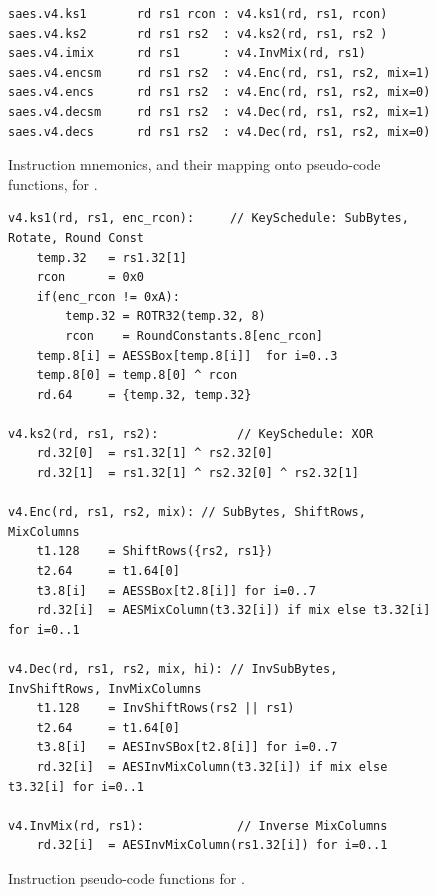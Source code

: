 
\vspace*{\fill}

\begin{figure}[!h]
\begin{lstlisting}[language=pseudo,style=block]
saes.v4.ks1       rd rs1 rcon : v4.ks1(rd, rs1, rcon)
saes.v4.ks2       rd rs1 rs2  : v4.ks2(rd, rs1, rs2 )
saes.v4.imix      rd rs1      : v4.InvMix(rd, rs1)
saes.v4.encsm     rd rs1 rs2  : v4.Enc(rd, rs1, rs2, mix=1)
saes.v4.encs      rd rs1 rs2  : v4.Enc(rd, rs1, rs2, mix=0)
saes.v4.decsm     rd rs1 rs2  : v4.Dec(rd, rs1, rs2, mix=1)
saes.v4.decs      rd rs1 rs2  : v4.Dec(rd, rs1, rs2, mix=0)
\end{lstlisting}
\caption{
  Instruction mnemonics, and their mapping onto pseudo-code functions, for .
}
\label{fig:v4:mnemonics}
\end{figure}

\begin{figure}[!h]
\begin{lstlisting}[language=pseudo,style=block]
v4.ks1(rd, rs1, enc_rcon):     // KeySchedule: SubBytes, Rotate, Round Const
    temp.32   = rs1.32[1]
    rcon      = 0x0
    if(enc_rcon != 0xA):
        temp.32 = ROTR32(temp.32, 8)
        rcon    = RoundConstants.8[enc_rcon]
    temp.8[i] = AESSBox[temp.8[i]]  for i=0..3
    temp.8[0] = temp.8[0] ^ rcon
    rd.64     = {temp.32, temp.32}

v4.ks2(rd, rs1, rs2):           // KeySchedule: XOR
    rd.32[0]  = rs1.32[1] ^ rs2.32[0]
    rd.32[1]  = rs1.32[1] ^ rs2.32[0] ^ rs2.32[1]

v4.Enc(rd, rs1, rs2, mix): // SubBytes, ShiftRows, MixColumns
    t1.128    = ShiftRows({rs2, rs1})
    t2.64     = t1.64[0]
    t3.8[i]   = AESSBox[t2.8[i]] for i=0..7
    rd.32[i]  = AESMixColumn(t3.32[i]) if mix else t3.32[i] for i=0..1

v4.Dec(rd, rs1, rs2, mix, hi): // InvSubBytes, InvShiftRows, InvMixColumns
    t1.128    = InvShiftRows(rs2 || rs1)
    t2.64     = t1.64[0]
    t3.8[i]   = AESInvSBox[t2.8[i]] for i=0..7
    rd.32[i]  = AESInvMixColumn(t3.32[i]) if mix else t3.32[i] for i=0..1

v4.InvMix(rd, rs1):             // Inverse MixColumns
    rd.32[i]  = AESInvMixColumn(rs1.32[i]) for i=0..1
\end{lstlisting}
\caption{
  Instruction pseudo-code functions for .
}
\label{fig:v4:pseudo}
\end{figure}

